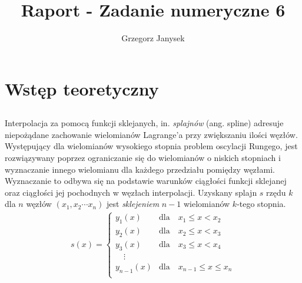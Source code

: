 \documentclass[11pt]{extarticle}
\author{Grzegorz Janysek}
\title{Raport - Zadanie numeryczne 6}
\begin{document}
	\maketitle

	\section{Wstęp teoretyczny}

	\subsection{}
	Interpolacja za pomocą funkcji sklejanych, in. \textit{splajnów} (ang. spline) adresuje niepożądane zachowanie wielomianów Lagrange'a przy zwiększaniu ilości węzłów.
	Występujący dla wielomianów wysokiego stopnia problem oscylacji Rungego, jest rozwiązywany poprzez ograniczanie się do wielomianów o niskich stopniach i wyznaczanie innego wielomianu dla każdego przedziału pomiędzy węzłami.
	Wyznaczanie to odbywa się na podstawie warunków ciągłości funkcji sklejanej oraz ciągłości jej pochodnych w węzłach interpolacji.
	Uzyskany splajn \(s\) rzędu \(k\) dla \(n\) węzłów \((x_1, x_2 \dotsm x_n)\) jest \textit{sklejeniem} \(n-1\) wielomianów \(k\)-tego stopnia.
	\begin{align}
		s(x) =
		\left\{
			\begin{array}{ll}
				y_{1}(x)  & \mbox{dla} \quad x_1 \leq x < x_2 \\
				y_{2}(x)  & \mbox{dla} \quad x_2 \leq x < x_3 \\
				y_{3}(x)  & \mbox{dla} \quad x_3 \leq x < x_4 \\
				\quad \vdots \\
				y_{n-1}(x)  & \mbox{dla} \quad x_{n-1} \leq x \leq x_n \\
			\end{array}
		\right.
	\end{align}
	
\end{document}
